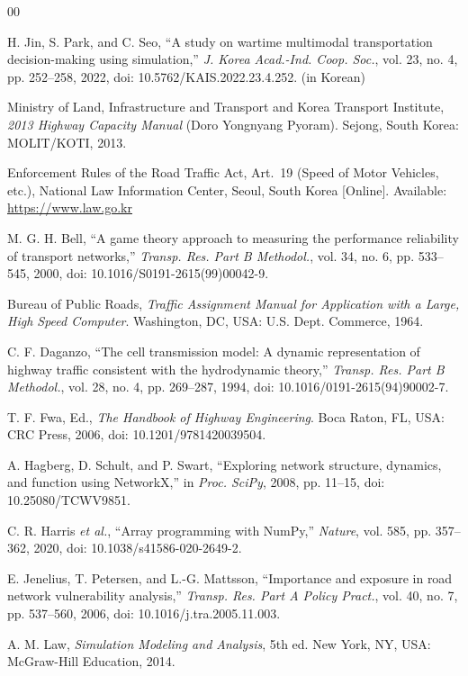 \documentclass{ieeeaccess}
\begin{document}
\begin{thebibliography}{00}

 H. Jin, S. Park, and C. Seo, ``A study on wartime multimodal transportation decision-making using simulation,'' \emph{J. Korea Acad.-Ind. Coop. Soc.}, vol. 23, no. 4, pp. 252--258, 2022, doi: 10.5762/KAIS.2022.23.4.252. (in Korean)

 Ministry of Land, Infrastructure and Transport and Korea Transport Institute, \emph{2013 Highway Capacity Manual} (Doro Yongnyang Pyoram). Sejong, South Korea: MOLIT/KOTI, 2013.

 Enforcement Rules of the Road Traffic Act, Art.~19 (Speed of Motor Vehicles, etc.), National Law Information Center, Seoul, South Korea [Online]. Available: \underline{https://www.law.go.kr}

 M. G. H. Bell, ``A game theory approach to measuring the performance reliability of transport networks,'' \emph{Transp. Res. Part B Methodol.}, vol. 34, no. 6, pp. 533--545, 2000, doi: 10.1016/S0191-2615(99)00042-9.

 Bureau of Public Roads, \emph{Traffic Assignment Manual for Application with a Large, High Speed Computer}. Washington, DC, USA: U.S. Dept. Commerce, 1964.

 C. F. Daganzo, ``The cell transmission model: A dynamic representation of highway traffic consistent with the hydrodynamic theory,'' \emph{Transp. Res. Part B Methodol.}, vol. 28, no. 4, pp. 269--287, 1994, doi: 10.1016/0191-2615(94)90002-7.

 T. F. Fwa, Ed., \emph{The Handbook of Highway Engineering}. Boca Raton, FL, USA: CRC Press, 2006, doi: 10.1201/9781420039504.

 A. Hagberg, D. Schult, and P. Swart, ``Exploring network structure, dynamics, and function using NetworkX,'' in \emph{Proc. SciPy}, 2008, pp. 11--15, doi: 10.25080/TCWV9851.

 C. R. Harris \emph{et al.}, ``Array programming with NumPy,'' \emph{Nature}, vol. 585, pp. 357--362, 2020, doi: 10.1038/s41586-020-2649-2.

 E. Jenelius, T. Petersen, and L.-G. Mattsson, ``Importance and exposure in road network vulnerability analysis,'' \emph{Transp. Res. Part A Policy Pract.}, vol. 40, no. 7, pp. 537--560, 2006, doi: 10.1016/j.tra.2005.11.003.

 A. M. Law, \emph{Simulation Modeling and Analysis}, 5th ed. New York, NY, USA: McGraw-Hill Education, 2014.


\end{thebibliography}
\end{document}
